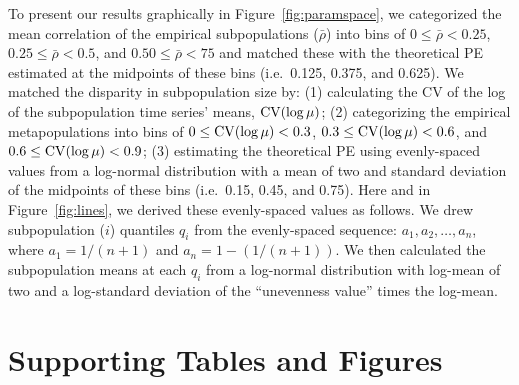 To present our results graphically in Figure~\ref{fig:paramspace}, we categorized
the mean correlation of the empirical subpopulations ($\bar{\rho}$) into bins of
$0 \le \bar{\rho} < 0.25$, $0.25 \le \bar{\rho} < 0.5$, and $0.50 \le \bar{\rho}
< 75$ and matched these with the theoretical PE estimated at the midpoints of
these bins (i.e.\ 0.125, 0.375, and 0.625).  We matched the disparity in
subpopulation size by: (1) calculating the CV of the log of the subpopulation
time series' means, $\mathrm{CV}(\log\mu)$; (2) categorizing the empirical
metapopulations into bins of $0 \le \mathrm{CV}(\log\mu) < 0.3$, $0.3 \le \mathrm{CV}(\log\mu) <
0.6$, and $0.6 \le \mathrm{CV}(\log\mu) < 0.9$; (3) estimating the theoretical PE using
evenly-spaced values from a log-normal distribution with a mean of two and
standard deviation of the midpoints of these bins (i.e.\ 0.15, 0.45, and 0.75).
Here and in Figure~\ref{fig:lines}, we derived these evenly-spaced values as
follows.
We drew subpopulation ($i$) quantiles $q_i$ from the evenly-spaced sequence:
$a_1, a_2, \ldots, a_n$, where $a_1 = 1/(n+1)$ and $a_n = 1-(1/(n+1))$. We then
calculated the subpopulation means at each $q_i$ from a log-normal distribution
with log-mean of two and a log-standard deviation of the ``unevenness value''
times the log-mean.

\renewcommand{\baselinestretch}{\tighttextstretch} %
\normalsize


\clearpage
\renewcommand{\baselinestretch}{\textstretch} %
\normalsize



\section{Supporting Tables and Figures}

\begin{landscape}


  
\end{landscape}
\clearpage


\clearpage

\clearpage

